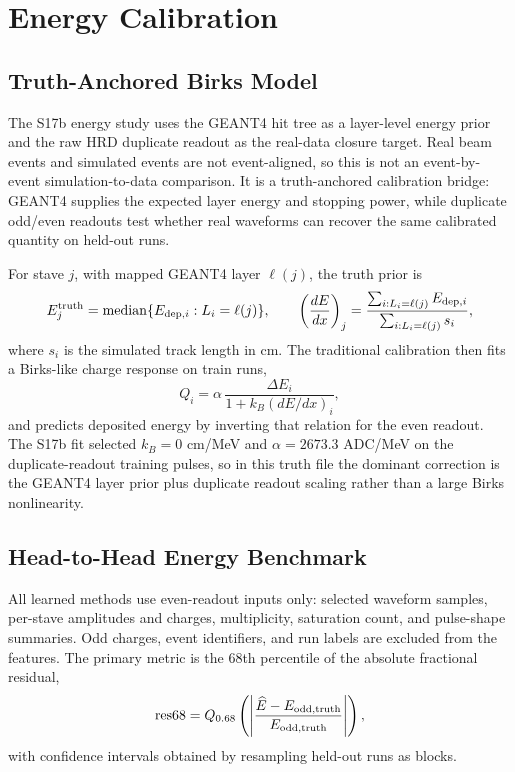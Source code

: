 \section{Energy Calibration}

\subsection{Truth-Anchored Birks Model}

The S17b energy study uses the GEANT4 hit tree as a layer-level energy prior and
the raw HRD duplicate readout as the real-data closure target. Real beam events
and simulated events are not event-aligned, so this is not an event-by-event
simulation-to-data comparison. It is a truth-anchored calibration bridge:
GEANT4 supplies the expected layer energy and stopping power, while duplicate
odd/even readouts test whether real waveforms can recover the same calibrated
quantity on held-out runs.

For stave \(j\), with mapped GEANT4 layer \(\ell(j)\), the truth prior is
\[
E^{\rm truth}_{j} =
{\rm median}\{E_{{\rm dep},i}: L_i=\ell(j)\},
\qquad
\left(\frac{dE}{dx}\right)_j =
\frac{\sum_{i:L_i=\ell(j)} E_{{\rm dep},i}}
{\sum_{i:L_i=\ell(j)} s_i},
\]
where \(s_i\) is the simulated track length in cm. The traditional calibration
then fits a Birks-like charge response on train runs,
\[
Q_i = \alpha\,
\frac{\Delta E_i}{1+k_B(dE/dx)_i},
\]
and predicts deposited energy by inverting that relation for the even readout.
The S17b fit selected \(k_B=0\) cm/MeV and
\(\alpha=2673.3\) ADC/MeV on the duplicate-readout training pulses, so in this
truth file the dominant correction is the GEANT4 layer prior plus duplicate
readout scaling rather than a large Birks nonlinearity.

\subsection{Head-to-Head Energy Benchmark}

All learned methods use even-readout inputs only: selected waveform samples,
per-stave amplitudes and charges, multiplicity, saturation count, and pulse-shape
summaries. Odd charges, event identifiers, and run labels are excluded from the
features. The primary metric is the 68th percentile of the absolute fractional
residual,
\[
{\rm res68} =
Q_{0.68}\left(
\left|\frac{\widehat E - E_{\rm odd,truth}}{E_{\rm odd,truth}}\right|
\right),
\]
with confidence intervals obtained by resampling held-out runs as blocks.

